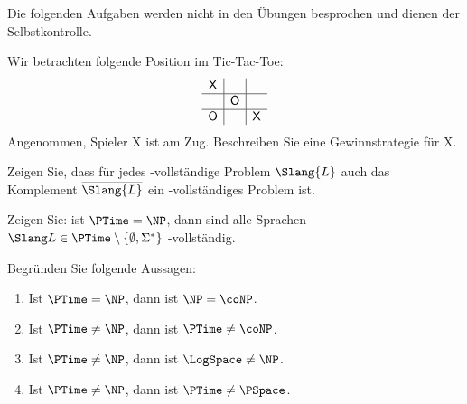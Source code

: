 \documentclass[german]{latteachCD}[2017/03/28]
\begin{document}
\maketitle

\begin{mdframed}
  Die folgenden Aufgaben werden nicht in den Übungen besprochen und dienen der
  Selbstkontrolle.

  \renewcommand{\theexercise}{\BoldGreek{exercise}}
  \setcounter{exercise}{5}

  \begin{exercise}
    Wir betrachten folgende Position im Tic-Tac-Toe:
    \begin{equation*}
      \begin{array}{c|c|c}
        \mathsf{X}&& \\\hline
                  &\mathsf{O}& \\\hline
        \mathsf{O}&&\mathsf{X}
      \end{array}
    \end{equation*}
    Angenommen, Spieler \textsf{X} ist am Zug.  Beschreiben Sie eine
    Gewinnstrategie für \textsf{X}.
  \end{exercise}

  \begin{exercise}
    Zeigen Sie, dass für jedes \PSpace-vollständige Problem $\Slang{L}$ auch das
    Komplement $\overline{\Slang{L}}$ ein \PSpace-vollständiges Problem ist.
  \end{exercise}

  \begin{exercise}
    Zeigen Sie: ist $\PTime = \NP$, dann sind alle Sprachen $\Slang L \in \PTime
    \setminus \{\emptyset, \Sigma^{*}\}$ \NP-vollständig.
  \end{exercise}

\end{mdframed}

\vspace*{0.5\baselineskip}

\setcounter{exercise}{0}

\begin{exercise}
  Begründen Sie folgende Aussagen:
  \begin{enumerate}
  \item Ist $\PTime = \NP$, dann ist $\NP = \coNP$.
  \item Ist $\PTime \neq \NP$, dann ist $\PTime \neq \coNP$.
  \item Ist $\PTime \neq \NP$, dann ist $\LogSpace \neq \NP$.
  \item Ist $\PTime \neq \NP$, dann ist $\PTime \neq \PSpace$.
  \end{enumerate}
\end{exercise}
\end{document}
